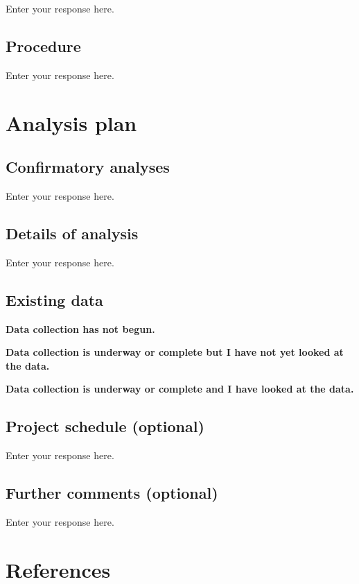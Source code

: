 \documentclass[]{article}
\begin{document}
Enter your response here.

\hypertarget{procedure}{%
\subsection{Procedure}\label{procedure}}

Enter your response here.

\hypertarget{analysis-plan}{%
\section{Analysis plan}\label{analysis-plan}}

\hypertarget{confirmatory-analyses}{%
\subsection{Confirmatory analyses}\label{confirmatory-analyses}}

Enter your response here.

\hypertarget{details-of-analysis}{%
\subsection{Details of analysis}\label{details-of-analysis}}

Enter your response here.

\hypertarget{existing-data}{%
\subsection{Existing data}\label{existing-data}}

\textbf{Data collection has not begun.}

\textbf{Data collection is underway or complete but I have not yet
looked at the data.}

\textbf{Data collection is underway or complete and I have looked at the
data.}

\hypertarget{project-schedule-optional}{%
\subsection{Project schedule
(optional)}\label{project-schedule-optional}}

Enter your response here.

\hypertarget{further-comments-optional}{%
\subsection{Further comments
(optional)}\label{further-comments-optional}}

Enter your response here.

\hypertarget{references}{%
\section{References}\label{references}}

\hypertarget{section}{%
\subsection{}\label{section}}

\vspace{-2pc}
\setlength{\parindent}{-0.5in}
\setlength{\leftskip}{-1in}
\setlength{\parskip}{8pt}

\noindent
\end{document}
